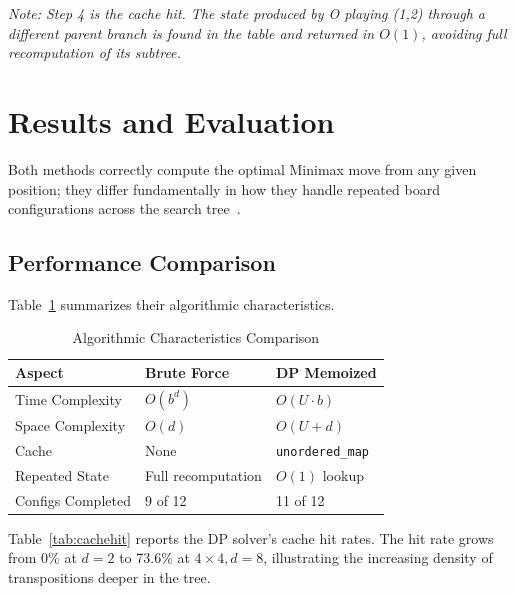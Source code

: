 \documentclass[conference]{IEEEtran}
\begin{document}
\textit{Note: Step 4 is the cache hit. The state produced by O playing
(1,2) through a different parent branch is found in the table and
returned in $O(1)$, avoiding full recomputation of its subtree.}

\section{Results and Evaluation}

Both methods correctly compute the optimal Minimax move from any given
position; they differ fundamentally in how they handle repeated board
configurations across the search tree~\cite{b3, b4}.

\subsection{Performance Comparison}
Table~\ref{tab:comparison} summarizes their algorithmic characteristics.

\begin{table}[htbp]
\centering
\caption{Algorithmic Characteristics Comparison}
\label{tab:comparison}
\renewcommand{\arraystretch}{1.6}
\begin{tabular}{|p{2.2cm}|p{2.0cm}|p{2.0cm}|}
\hline
\textbf{Aspect} & \textbf{Brute Force} & \textbf{DP Memoized} \\
\hline
Time Complexity & $O(b^d)$ & $O(U \cdot b)$ \\
\hline
Space Complexity & $O(d)$ & $O(U + d)$ \\
\hline
Cache & None & \texttt{unordered\_map} \\
\hline
Repeated State & Full recomputation & $O(1)$ lookup \\
\hline
Configs Completed & 9 of 12 & 11 of 12 \\
\hline
\end{tabular}
\end{table}

Table~\ref{tab:cachehit} reports the DP solver’s cache hit rates. The
hit rate grows from 0\% at $d=2$ to 73.6\% at $4\times4, d=8$, illustrating
the increasing density of transpositions deeper in the tree.
\end{document}
